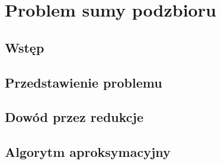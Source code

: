 \chapter{Problem sumy podzbioru}

\section{Wstęp}

\section{Przedstawienie problemu}

\section{Dowód przez redukcje}

\section{Algorytm aproksymacyjny}
